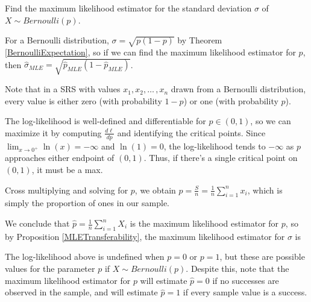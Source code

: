 \begin{examp}Find the maximum likelihood estimator for the standard deviation $\sigma$ of $X \sim Bernoulli(p)$.
\par
\noindent For a Bernoulli distribution, $\sigma = \sqrt{p(1-p)}$ by Theorem \ref{BernoulliExpectation}, so if we can find the maximum likelihood estimator for $p$, then $\widehat{\sigma}_{MLE} = \sqrt{\widehat{p}_{MLE}(1-\widehat{p}_{MLE})}$. 
\par
\noindent Note that in a SRS with values $x_1, x_2, \dots\,,x_n$ drawn from a Bernoulli distribution, every value is either zero (with probability $1-p$) or one (with probability $p$). 
\par
\noindent The log-likelihood is well-defined and differentiable for $p \in (0,1)$, so we can maximize it by computing $\frac{d\ell}{dp}$ and identifying the critical points. Since $\lim_{x \to 0^{+}} \ln(x) = -\infty$ and $\ln(1) = 0$, the log-likelihood tends to $-\infty$ as $p$ approaches either endpoint of $(0,1)$. Thus, if there's a single critical point on $(0,1)$, it must be a max.
\par
\noindent Cross multiplying and solving for $p$, we obtain $p = \frac{S}{n} = \frac{1}{n}\sum_{i=1}^{n} x_i$, which is simply the proportion of ones in our sample.
\par
\noindent We conclude that $\widehat{p} = \frac{1}{n}\sum_{i=1}^{n}X_i$ is the maximum likelihood estimator for $p$, so by Proposition \ref{MLETransferability}, the maximum likelihood estimator for $\sigma$ is
\end{examp}
\par
\noindent\rmk The log-likelihood above is undefined when $p = 0$ or $p=1$, but these are possible values for the parameter $p$ if $X \sim Bernoulli(p)$. Despite this, note that the maximum likelihood estimator for $p$ will estimate $\widehat{p} = 0$ if no successes are observed in the sample, and will estimate $\widehat{p} = 1$ if every sample value is a success.


